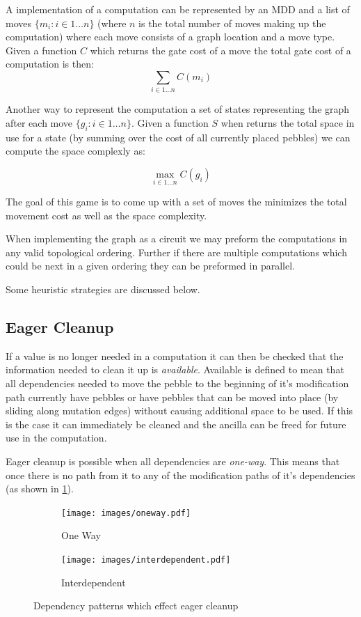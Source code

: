 A implementation of a computation can be represented by an MDD and a list of
moves $\{m_i:i \in 1 \dotsc n\}$ (where $n$ is the total number of moves making up the
computation) where each move consists of a graph location and a move type. Given
a function $C$ which returns the gate cost of a move the total gate cost of a
computation is then:
\[ \sum_{i\in 1 \dotsc n} C(m_i) \]

Another way to represent the computation a set of states representing the graph
after each move $\{g_i:i \in 1 \dotsc n\}$. Given a function $S$ when returns
the total space in use for a state (by summing over the cost of all currently
placed pebbles) we can compute the space complexly as:

\[ \max_{i\in 1 \dotsc n} C(g_i) \]

The goal of this game is to come up with a set of moves the minimizes the total
movement cost as well as the space complexity.

When implementing the graph as a circuit we may preform the computations in any
valid topological ordering. Further if there are multiple computations which
could be next in a given ordering they can be preformed in parallel.

Some heuristic strategies are discussed below.

\subsection{Eager Cleanup}

If a value is no longer needed in a computation it can then be checked that the
information needed to clean it up is \emph{available}. Available is defined to
mean that all dependencies needed to move the pebble to the beginning of it's
modification path currently have pebbles or have pebbles that can be moved into
place (by sliding along mutation edges) without causing additional space to be
used. If this is the case it can immediately be cleaned and the ancilla can be
freed for future use in the computation.

Eager cleanup is possible when all dependencies are \emph{one-way}.
This means that once there is no path from it to any of the modification paths
of it's dependencies (as shown in \cref{fig:one-way}).

\begin{figure}
  \centering
  \begin{subfigure}[b]{0.3\textwidth}
    \texttt{[image: images/oneway.pdf]}
    \caption{One Way}
    \label{fig:one-way}
  \end{subfigure}
  \qquad
  \begin{subfigure}[b]{0.3\textwidth}
    \texttt{[image: images/interdependent.pdf]}
    \caption{Interdependent}
    \label{fig:interdep}
  \end{subfigure}
  \caption{Dependency patterns which effect eager cleanup}
\end{figure}


